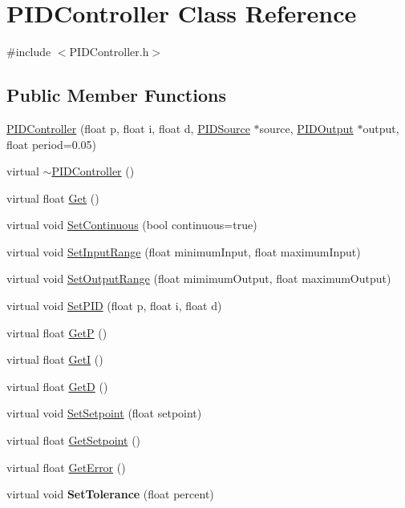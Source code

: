 \hypertarget{classPIDController}{
\section{PIDController Class Reference}
\label{classPIDController}
}


{\ttfamily \#include $<$PIDController.h$>$}

\subsection*{Public Member Functions}
\begin{DoxyCompactItemize}
\item 
\hyperlink{classPIDController_aeb0e62ab4c39e61826b71b4177eb97d5}{PIDController} (float p, float i, float d, \hyperlink{classPIDSource}{PIDSource} $\ast$source, \hyperlink{classPIDOutput}{PIDOutput} $\ast$output, float period=0.05)
\item 
virtual \hyperlink{classPIDController_a690e7ad4796e5c5143aa4b90f2f6677b}{$\sim$PIDController} ()
\item 
virtual float \hyperlink{classPIDController_a5d096c87981f6612fe0cf496cea9772a}{Get} ()
\item 
virtual void \hyperlink{classPIDController_adc068e4069028a0546fad0bee0ef32ca}{SetContinuous} (bool continuous=true)
\item 
virtual void \hyperlink{classPIDController_aa105ab2c2020dfc767fe9b585be0103a}{SetInputRange} (float minimumInput, float maximumInput)
\item 
virtual void \hyperlink{classPIDController_afa64ecde5d075a47a4cd1431f77b6060}{SetOutputRange} (float mimimumOutput, float maximumOutput)
\item 
virtual void \hyperlink{classPIDController_a1e4bf6acfb4eccb1b38f3f74ef74f995}{SetPID} (float p, float i, float d)
\item 
virtual float \hyperlink{classPIDController_a9572c875b0fee00189e7e22250db3831}{GetP} ()
\item 
virtual float \hyperlink{classPIDController_aad4c914184a37b8ceb85401d59ff163b}{GetI} ()
\item 
virtual float \hyperlink{classPIDController_a003738f4df587babc119131cdfada553}{GetD} ()
\item 
virtual void \hyperlink{classPIDController_a60e89182f28d2cc1ee5adf481c2003c9}{SetSetpoint} (float setpoint)
\item 
virtual float \hyperlink{classPIDController_ac25eb01ba2a0118f692bae207de62d63}{GetSetpoint} ()
\item 
virtual float \hyperlink{classPIDController_aba10571498bacd21469121d4af1f4757}{GetError} ()
\item 
\hypertarget{classPIDController_a86cba2e65c803b3f3d2c63ea0dfdaec4}{
virtual void {\bfseries SetTolerance} (float percent)}
\label{classPIDController_a86cba2e65c803b3f3d2c63ea0dfdaec4}


\end{DoxyCompactItemize}
